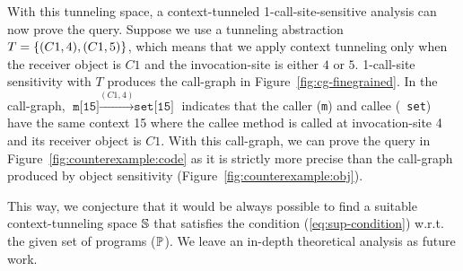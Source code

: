 With this tunneling space, a context-tunneled 1-call-site-sensitive analysis can now prove the query. 
Suppose we use a tunneling abstraction $T = \{ (C1,4), (C1,5) \}$, which means that we apply context tunneling only when the receiver object is $C1$ and the invocation-site is either $4$ or $5$. 1-call-site sensitivity with $T$ produces the call-graph in Figure~\ref{fig:cg-finegrained}. 
In the call-graph, $\texttt{m[15]} \stackrel{(C1,4)}{\to}
\texttt{set[15]}$ indicates that the caller ({\tt m}) and callee ({\tt
  set}) have the same context 15 where the callee method is called at
invocation-site 4 and its receiver object is $C1$. With this call-graph, we can prove the query 
in Figure~\ref{fig:counterexample:code} as it is strictly more precise than the call-graph produced by object sensitivity
(Figure~\ref{fig:counterexample:obj}). 






This way, we conjecture that it would be always possible to find a suitable context-tunneling space $\mathbb{S}$ that satisfies the condition (\ref{eq:sup-condition}) w.r.t. the given set of programs ($\mathbb{P}$). We leave an in-depth theoretical analysis as future work. 





